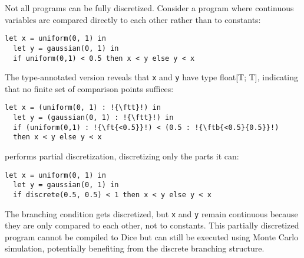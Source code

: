 \documentclass[acmsmall,screen,dvipsnames,x11names,nonacm,anonymous,review]{acmart}
\newcommand{\codetype}[1]{\textcolor{typecolor}{\ttfamily\small#1}}
\newcommand{\ftb}[2]{\codetype{float[\{#1\}; \{#2\}]}}  %
\newcommand{\ft}[1]{\codetype{float[\{#1\}; T]}}        %
\newcommand{\ftt}{\codetype{float[T; T]}}               %
\begin{document}
Not all programs can be fully discretized. Consider a program where continuous variables are compared directly to each other rather than to constants:

\begin{lstlisting}[aboveskip=1em,belowskip=1em,escapechar=!]
  let x = uniform(0, 1) in
  let y = gaussian(0, 1) in
  if uniform(0,1) < 0.5 then x < y else y < x
\end{lstlisting}

\noindent The type-annotated version reveals that \texttt{x} and \texttt{y} have type \ftt, indicating that no finite set of comparison points suffices:

\begin{lstlisting}[aboveskip=1em,belowskip=1em,escapechar=!]
  let x = (uniform(0, 1) : !{\ftt}!) in
  let y = (gaussian(0, 1) : !{\ftt}!) in
  if (uniform(0,1) : !{\ft{<0.5}}!) < (0.5 : !{\ftb{<0.5}{0.5}}!) 
  then x < y else y < x
\end{lstlisting}

\noindent \Slice{} performs partial discretization, discretizing only the parts it can:

\begin{lstlisting}[aboveskip=1em,belowskip=1em]
  let x = uniform(0, 1) in
  let y = gaussian(0, 1) in
  if discrete(0.5, 0.5) < 1 then x < y else y < x
\end{lstlisting}

\noindent The branching condition gets discretized, but \texttt{x} and \texttt{y} remain continuous because they are only compared to each other, not to constants. This partially discretized program cannot be compiled to Dice but can still be executed using Monte Carlo simulation, potentially benefiting from the discrete branching structure.



\end{document}

